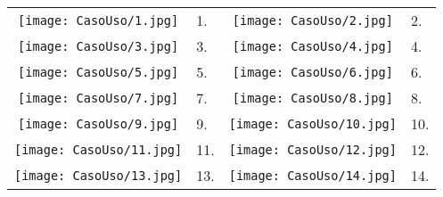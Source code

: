     
	\begin{longtable}{cm{}cm{}}
	\centering
		 \texttt{[image: CasoUso/1.jpg]} & 1. &
		 \texttt{[image: CasoUso/2.jpg]} & 2.  \\
		 \texttt{[image: CasoUso/3.jpg]} & 3. & 
		  \texttt{[image: CasoUso/4.jpg]} & 4.  \\
		 \texttt{[image: CasoUso/5.jpg]} & 5. & 
		  \texttt{[image: CasoUso/6.jpg]} & 6.  \\
		 \texttt{[image: CasoUso/7.jpg]} & 7. & 
		  \texttt{[image: CasoUso/8.jpg]} & 8.  \\
		 \texttt{[image: CasoUso/9.jpg]} & 9. & 
		  \texttt{[image: CasoUso/10.jpg]} & 10.  \\
		 \texttt{[image: CasoUso/11.jpg]} & 11. & 
		  \texttt{[image: CasoUso/12.jpg]} & 12.  \\
		 \texttt{[image: CasoUso/13.jpg]} & 13. & 
		  \texttt{[image: CasoUso/14.jpg]} & 14.  \\
	\end{longtable}